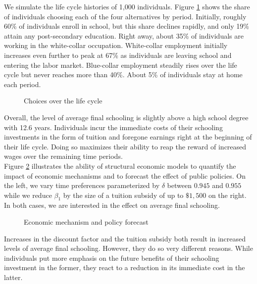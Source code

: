 \noindent We simulate the life cycle histories of 1,000 individuals. Figure \ref{Choices over the life cycle} shows the share of individuals choosing each of the four alternatives by period. Initially, roughly 60\% of individuals enroll in school, but this share declines rapidly, and only 19\% attain any post-secondary education. Right away, about 35\% of individuals are working in the white-collar occupation.  White-collar employment initially increases even further to peak at 67\% as individuals are leaving school and entering the labor market. Blue-collar employment steadily rises over the life cycle but never reaches more than 40\%. About 5\% of individuals stay at home each period.

\begin{figure}[ht!]\centering
\caption{Choices over the life cycle}\label{Choices over the life cycle}
\end{figure}\FloatBarrier

\noindent Overall, the level of average final schooling is slightly above a high school degree with 12.6 years. Individuals incur the immediate costs of their schooling investments in the form of tuition and foregone earnings right at the beginning of their life cycle. Doing so maximizes their ability to reap the reward of increased wages over the remaining time periods.\\

\noindent Figure \ref{Economic mechanism and policy forecast} illustrates the ability of structural economic models to quantify the impact of economic mechanisms and to forecast the effect of public policies. On the left, we vary time preferences parameterized by $\delta$ between $0.945$ and $0.955$ while we reduce $\beta_1$ by the size of a tuition subsidy of up to $\$1,500$ on the right. In both cases, we are interested in the effect on average final schooling.

\begin{figure}[h!]\centering
\caption{Economic mechanism and policy forecast}\label{Economic mechanism and policy forecast}
\hspace{0.3cm}
\end{figure}\FloatBarrier

\noindent Increases in the discount factor and the tuition subsidy both result in increased levels of average final schooling. However, they do so very different reasons. While individuals put more emphasis on the future benefits of their schooling investment in the former, they react to a reduction in its immediate cost in the latter.
